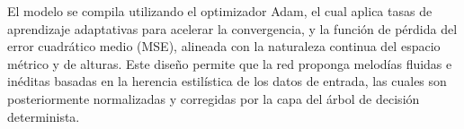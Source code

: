 El modelo se compila utilizando el optimizador Adam, el cual aplica tasas de aprendizaje adaptativas para acelerar la convergencia, y la función de pérdida del error cuadrático medio (MSE), alineada con la naturaleza continua del espacio métrico y de alturas. Este diseño permite que la red proponga melodías fluidas e inéditas basadas en la herencia estilística de los datos de entrada, las cuales son posteriormente normalizadas y corregidas por la capa del árbol de decisión determinista.
